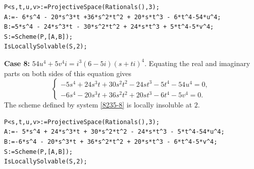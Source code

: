 \documentclass[a4paper,12pt,english,reqno]{amsart}
\begin{document}
\begin{lstlisting}
P<s,t,u,v>:=ProjectiveSpace(Rationals(),3);
A:=- 6*s^4 - 20*s^3*t +36*s^2*t^2 + 20*s*t^3 - 6*t^4-54*u^4;
B:=5*s^4 - 24*s^3*t - 30*s^2*t^2 + 24*s*t^3 + 5*t^4-5*v^4;
S:=Scheme(P,[A,B]);
IsLocallySolvable(S,2);
\end{lstlisting}


{\bf Case 8:} $54u^4+5v^4i=i^3(6-5i)(s+ti)^4$. Equating the real and imaginary parts on both sides of this equation gives
\begin{equation}\label{8235-8}
\begin{cases}
-5s^4 + 24s^3t + 30s^2t^2 - 24st^3 - 5t^4 - 54u^4=0,\\
-6s^4 - 20s^3t + 36s^2t^2 + 20st^3 - 6t^4 - 5v^4=0.
\end{cases}
\end{equation}
The scheme defined by system \eqref{8235-8} is locally insoluble at $2$.


\begin{lstlisting}
P<s,t,u,v>:=ProjectiveSpace(Rationals(),3);
A:=- 5*s^4 + 24*s^3*t + 30*s^2*t^2 - 24*s*t^3 - 5*t^4-54*u^4;
B:=-6*s^4 - 20*s^3*t + 36*s^2*t^2 + 20*s*t^3 - 6*t^4-5*v^4;
S:=Scheme(P,[A,B]);
IsLocallySolvable(S,2);
\end{lstlisting}
\end{document}
